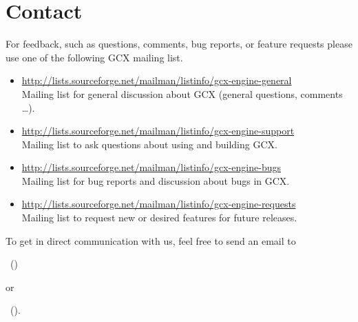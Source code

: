 \section{Contact}
For feedback, such as questions, comments, bug reports, or feature requests please use one of the following GCX mailing list.
\begin{itemize}
  \setlength{\itemsep}{0pt}
  \item \href{http://lists.sourceforge.net/mailman/listinfo/gcx-engine-general}{http://lists.sourceforge.net/mailman/listinfo/gcx-engine-general} \\ {\small Mailing list for general discussion about GCX (general questions, comments \ldots).}
  \item \href{http://lists.sourceforge.net/mailman/listinfo/gcx-engine-support}{http://lists.sourceforge.net/mailman/listinfo/gcx-engine-support} \\ {\small Mailing list to ask questions about using and building GCX.}
  \item \href{http://lists.sourceforge.net/mailman/listinfo/gcx-engine-bugs}{http://lists.sourceforge.net/mailman/listinfo/gcx-engine-bugs} \\ {\small Mailing list for bug reports and discussion about bugs in GCX.}
  \item \href{http://lists.sourceforge.net/mailman/listinfo/gcx-engine-requests}{http://lists.sourceforge.net/mailman/listinfo/gcx-engine-requests} \\ {\small Mailing list to request new or desired features for future releases.}
\end{itemize}

\noindent To get in direct communication with us, feel free to send an email to
\begin{center}
\myfirstauthor \ (\href{\myfirstauthoremailurl}{\myfirstauthoremail})
\end{center}

\noindent or
\begin{center}
\mysecondauthor \ (\href{\mysecondauthoremailurl}{\mysecondauthoremail}).
\end{center} 
